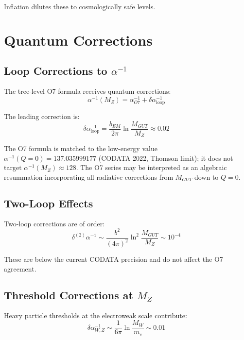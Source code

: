 \documentclass[11pt,a4paper]{article}
\begin{document}
Inflation dilutes these to cosmologically safe levels.


\section{Quantum Corrections}

\subsection{Loop Corrections to $\alpha^{-1}$}

The tree-level O7 formula receives quantum corrections:
\begin{equation}
\alpha^{-1}(M_Z) = \alpha^{-1}_{O7} + \delta\alpha^{-1}_{\text{loop}}
\end{equation}

The leading correction is:
\begin{equation}
\delta\alpha^{-1}_{\text{loop}} = \frac{b_{EM}}{2\pi}\ln\frac{M_{GUT}}{M_Z} \approx 0.02
\end{equation}

The O7 formula is matched to the low-energy value $\alpha^{-1}(Q = 0) = 137.035999177$ (CODATA 2022, Thomson limit); it does not target $\alpha^{-1}(M_Z) \approx 128$. The O7 series may be interpreted as an algebraic resummation incorporating all radiative corrections from $M_{GUT}$ down to $Q = 0$.

\subsection{Two-Loop Effects}

Two-loop corrections are of order:
\begin{equation}
\delta^{(2)}\alpha^{-1} \sim \frac{b^2}{(4\pi)^2}\ln^2\frac{M_{GUT}}{M_Z} \sim 10^{-4}
\end{equation}

These are below the current CODATA precision and do not affect the O7 agreement.

\subsection{Threshold Corrections at $M_Z$}

Heavy particle thresholds at the electroweak scale contribute:
\begin{equation}
\delta\alpha^{-1}_{W,Z} \sim \frac{1}{6\pi}\ln\frac{M_W}{m_e} \sim 0.01
\end{equation}
\end{document}
